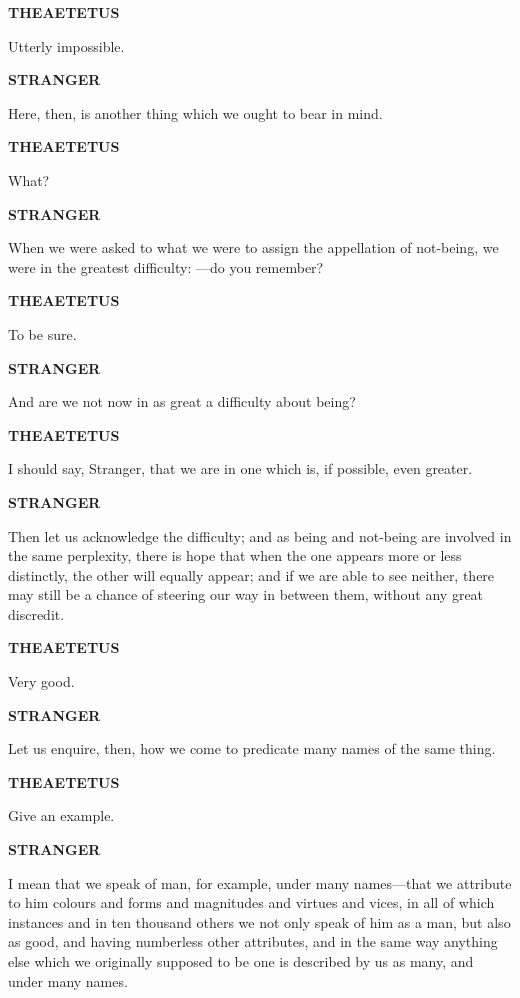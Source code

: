 \documentclass[11pt,letter]{article}
\begin{document}
\par \textbf{THEAETETUS}
\par   Utterly impossible.

\par \textbf{STRANGER}
\par   Here, then, is another thing which we ought to bear in mind.

\par \textbf{THEAETETUS}
\par   What?

\par \textbf{STRANGER}
\par   When we were asked to what we were to assign the appellation of not-being, we were in the greatest difficulty: —do you remember?

\par \textbf{THEAETETUS}
\par   To be sure.

\par \textbf{STRANGER}
\par   And are we not now in as great a difficulty about being?

\par \textbf{THEAETETUS}
\par   I should say, Stranger, that we are in one which is, if possible, even greater.

\par \textbf{STRANGER}
\par   Then let us acknowledge the difficulty; and as being and not-being are involved in the same perplexity, there is hope that when the one appears more or less distinctly, the other will equally appear; and if we are able to see neither, there may still be a chance of steering our way in between them, without any great discredit.

\par \textbf{THEAETETUS}
\par   Very good.

\par \textbf{STRANGER}
\par   Let us enquire, then, how we come to predicate many names of the same thing.

\par \textbf{THEAETETUS}
\par   Give an example.

\par \textbf{STRANGER}
\par   I mean that we speak of man, for example, under many names—that we attribute to him colours and forms and magnitudes and virtues and vices, in all of which instances and in ten thousand others we not only speak of him as a man, but also as good, and having numberless other attributes, and in the same way anything else which we originally supposed to be one is described by us as many, and under many names.
\end{document}
